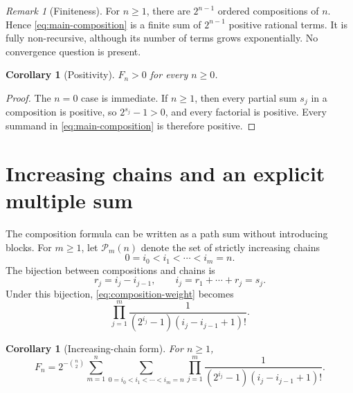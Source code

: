 \documentclass[11pt]{article}
\newtheorem{corollary}[theorem]{Corollary}
\theoremstyle{definition}
\theoremstyle{remark}
\newtheorem{remark}[theorem]{Remark}
\newcommand{\Chains}{\mathcal{P}}
\begin{document}
\begin{remark}[Finiteness]
For $n\geq1$, there are $2^{n-1}$ ordered compositions of $n$.  Hence
\eqref{eq:main-composition} is a finite sum of $2^{n-1}$ positive rational
terms.  It is fully non-recursive, although its number of terms grows
exponentially.  No convergence question is present.
\end{remark}

\begin{corollary}[Positivity]\label{cor:positive}
$F_n>0$ for every $n\geq0$.
\end{corollary}

\begin{proof}
The $n=0$ case is immediate.  If $n\geq1$, then every partial sum $s_j$ in
a composition is positive, so $2^{s_j}-1>0$, and every factorial is
positive.  Every summand in \eqref{eq:main-composition} is therefore
positive.
\end{proof}

\section{Increasing chains and an explicit multiple sum}

The composition formula can be written as a path sum without introducing
blocks.  For $m\geq1$, let $\Chains_m(n)$ denote the set of strictly
increasing chains
\begin{equation}\label{eq:chain}
 0=i_0<i_1<\cdots<i_m=n.
\end{equation}
The bijection between compositions and chains is
\begin{equation}\label{eq:chain-composition-bijection}
 r_j=i_j-i_{j-1},
 \qquad
 i_j=r_1+\cdots+r_j=s_j.
\end{equation}
Under this bijection, \eqref{eq:composition-weight} becomes
\begin{equation}\label{eq:chain-weight}
 \prod_{j=1}^{m}
 \frac{1}{(2^{i_j}-1)(i_j-i_{j-1}+1)!}.
\end{equation}

\begin{corollary}[Increasing-chain form]\label{cor:chains}
For $n\geq1$,
\begin{equation}\label{eq:chain-formula}
 \boxed{
 F_n=2^{-\binom n2}
 \sum_{m=1}^{n}
 \sum_{0=i_0<i_1<\cdots<i_m=n}
 \prod_{j=1}^{m}
 \frac{1}{(2^{i_j}-1)(i_j-i_{j-1}+1)!}.}
\end{equation}
\end{corollary}
\end{document}
